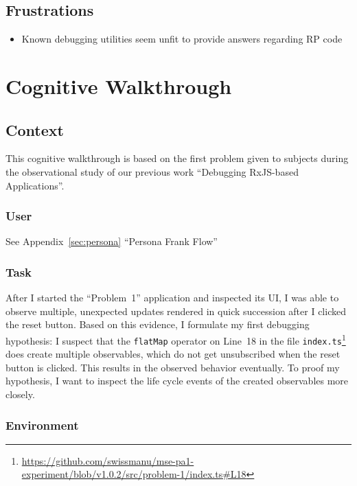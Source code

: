 \documentclass[sigplan,screen,nonacm,review]{acmart}
\begin{document}
\subsection{Frustrations}
\begin{itemize}
	\item Known debugging utilities seem unfit to provide answers regarding RP code
\end{itemize}


\section{Cognitive Walkthrough}
\label{sec:cogitive-walkthrough-appendix}

\subsection{Context}

This cognitive walkthrough is based on the first problem given to subjects during the observational study of our previous work ``Debugging RxJS-based Applications''\cite{TODO}.

\subsubsection{User}
See Appendix~\ref{sec:persona} ``Persona Frank Flow''

\subsubsection{Task}

After I started the ``Problem~1'' application and inspected its UI, I was able to observe multiple, unexpected updates rendered in quick succession after I clicked the reset button. Based on this evidence, I formulate my first debugging hypothesis: I suspect that the \texttt{flatMap} operator on Line~18 in the file \texttt{index.ts}\footnote{\url{https://github.com/swissmanu/mse-pa1-experiment/blob/v1.0.2/src/problem-1/index.ts\#L18}} does create multiple observables, which do not get unsubscribed when the reset button is clicked. This results in the observed behavior eventually. To proof my hypothesis, I want to inspect the life cycle events of the created observables more closely.

\subsubsection{Environment}
\end{document}
